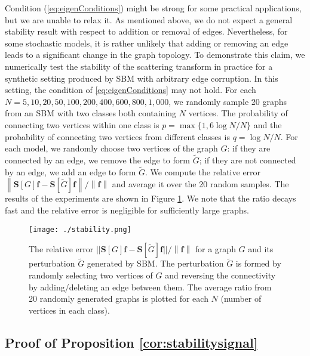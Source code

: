 \documentclass{article}
\def\tG{\tilde{G}}
\def\BS{\boldsymbol{S}}
\def\Bf{\boldsymbol{f}}
\newcommand{\norm}[1]{\left\lVert#1\right\rVert}
\begin{document}
Condition (\ref{eq:eigenConditions}) might be strong for some practical applications, but we are unable to relax it. {As mentioned above, we do not expect a general stability result with respect to addition or removal of edges. Nevertheless, for some stochastic models, it is rather unlikely that adding or removing an edge leads to a significant change in the graph topology. To demonstrate this claim, we numerically test} the stability of the scattering transform in practice for a synthetic setting produced by SBM with arbitrary edge corruption. In this setting, the condition of \eqref{eq:eigenConditions} may not hold. For each $N = 5,10,20,50,100,200,400,600,800,1,000$, we randomly sample 20 graphs from an SBM with two classes both containing $N$ vertices. The probability of connecting two vertices within one class is $p = \max \{1, 6 \log N / N\}$ and the probability of connecting two vertices from different classes is $q = \log N / N$. 
For each model, 
we randomly choose two vertices of the graph $G$: if they are connected by an edge, we remove the edge to form $\tilde{G}$; if they are not connected by an edge, we add an edge to form $\tilde{G}$. 
We compute the relative error $\norm{\BS[G]\Bf-\BS[\tG]\Bf} / \norm{\Bf}$  and average it over the 20 random samples. The results of the experiments are shown in Figure \ref{fig:sbmStability}. We note that the ratio decays fast and the relative error is negligible for sufficiently large graphs.

\begin{figure}[!ht]
    \centering
    \texttt{[image: ./stability.png]}
	\caption{The relative error $|| \BS[G]\Bf-\BS[\tG]\Bf || / \norm{\Bf} $ for a graph $G$ and its perturbation $\tilde{G}$ generated by SBM. The perturbation $\tilde{G}$
is formed by randomly selecting two vertices of $G$ and reversing the connectivity by adding/deleting an edge between them.
The average ratio from 20 randomly generated graphs is plotted for each $N$ (number of vertices in each class).}
    \label{fig:sbmStability}
\end{figure}




\subsection{Proof of Proposition \ref{cor:stabilitysignal}}
\end{document}

